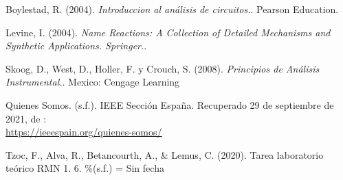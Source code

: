 \documentclass[12pt,letterpaper, onecolumn]{article}
\begin{document}
\begin{multicols}{2}
\begin{thebibliography}{99}
 Boylestad, R. (2004). \textit{Introduccion al análisis de circuitos.}. Pearson Education.

 Levine, I. (2004). \textit{Name Reactions: A Collection of Detailed Mechanisms and Synthetic Applications. Springer.}.

Skoog, D., West, D., Holler, F. y Crouch, S.  (2008). \textit{Principios de Análisis Instrumental.}. Mexico: Cengage Learning

 Quienes Somos. (s.f.). IEEE Sección España. Recuperado 29 de septiembre de 2021, de :\\
\url{https://ieeespain.org/quienes-somos/}

 Tzoc, F., Alva, R., Betancourth, A., \& Lemus, C. (2020). Tarea laboratorio teórico RMN 1. 6. \%(s.f.) = Sin fecha

\end{thebibliography}

\end{multicols}
\balance
\end{document}
